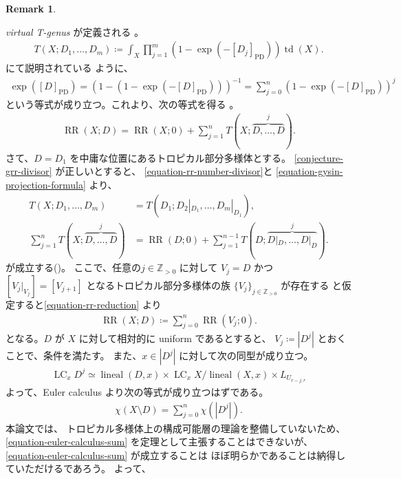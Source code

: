 \documentclass[a4paper,dvipdfmx,reqno,12pt]{amsart}
\theoremstyle{definition}
\newtheorem{remark}[theorem]{Remark}
\newcommand{\deq}{\coloneqq}
\newcommand{\opn}[1]{\operatorname{#1}}
\newcommand{\PD}[1]{[#1]_{\mathrm{PD}}}
\numberwithin{equation}{section}
\begin{document}
\begin{remark}
\label{remark-rr-in-ag}

\emph{virtual T-genus} が定義される
\cite[]{MR1335917}。
\begin{align}
T(X;D_1,\ldots,D_m)\deq
\int_X\prod_{j=1}^{m}(1-\opn{exp}(-\PD{D_j}))\opn{td}(X).
\end{align}
\cite[]{MR1335917} にて説明されている
ように、
\begin{align}
\opn{exp}(\PD{D})=(1-(1-\opn{exp}(-\PD{D})))^{-1}
=\sum_{j=0}^{n}(1-\opn{exp}(-\PD{D}))^j
\end{align}
という等式が成り立つ。これより、次の等式を得る
\cite[.(14)]{MR1335917}。
\begin{align}
\opn{RR}(X;D)=\opn{RR}(X;0)+
\sum_{j=1}^{n}T(X;\overbrace{D,\ldots,D}^{j}).
\end{align}
さて、$D=D_1$ を中庸な位置にあるトロピカル部分多様体とする。
\cref{conjecture-grr-divisor} が正しいとすると、
\cref{equation-rr-number-divisor}と
\cref{equation-gysin-projection-formula} より、
\begin{align}
T(X;D_1,\ldots,D_m)&=T(D_1;D_2|_{D_1},\ldots,D_m|_{D_1}), \\
\sum_{j=1}^{n}T(X;\overbrace{D,\ldots,D}^{j})
&=\opn{RR}(D;0)+\sum_{j=1}^{n-1}T(D;\overbrace{D|_D,\ldots,D|_{D}}^{j}).
\label{equation-rr-reduction}
\end{align}
が成立する(\cite[Theorem 11.2.1]{MR1335917})。
ここで、任意の$j\in \mathbb{Z}_{>0}$ に対して
$V_j=D$ かつ
$[V_{j}|_{V_{j}}]=[V_{j+1}]$ となるトロピカル部分多様体の族
$\{V_j\}_{j\in \mathbb{Z}_{>0}}$ が存在する
と仮定すると\eqref{equation-rr-reduction} より
\begin{align}
\opn{RR}(X;D)\deq \sum_{j=0}^{n}\opn{RR}(V_j;0).
\end{align}
となる。$D$ が $X$ に対して相対的に uniform であるとすると、
$V_j\deq |D^{j}|$ とおくことで、条件を満たす。 
また、$x\in |D^j|$ に対して次の同型が成り立つ。
\begin{align}
\opn{LC}_x D^{j}\simeq 
\opn{lineal}(D,x)\times \opn{LC}_x X/\opn{lineal}(X,x)
\times L_{U_{r-j,r}}
\end{align}
よって、Euler calculus より次の等式が成り立つはずである。
\begin{align}
\label{equation-euler-calculus-sum}
\chi(X\setminus D)=\sum_{j=0}^{n}\chi(|D^{j}|).
\end{align}
本論文では、
トロピカル多様体上の構成可能層の理論を整備していないため、
\eqref{equation-euler-calculus-sum}
を定理として主張することはできないが、
\eqref{equation-euler-calculus-sum} が成立することは
ほぼ明らかであることは納得していただけるであろう。
よって、
\end{remark}



\end{document}
